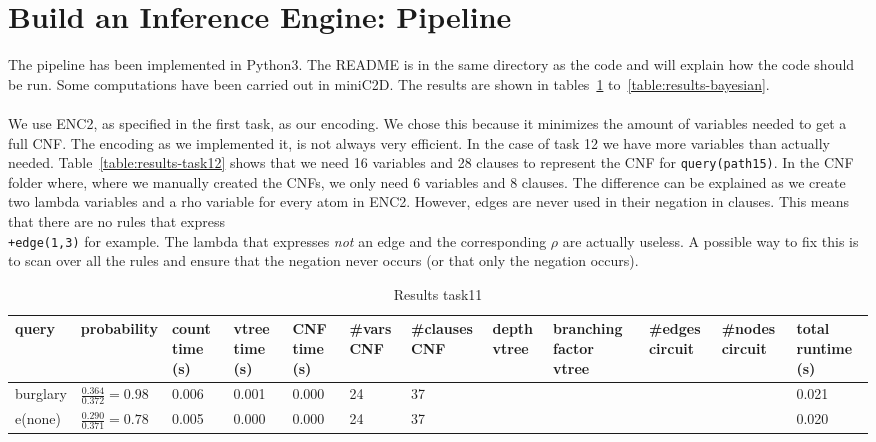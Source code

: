 \section{Build an Inference Engine: Pipeline}

The pipeline has been implemented in Python3. The README is in the same directory as the code and will explain how the code should be run. Some computations have been carried out in miniC2D. The results are shown in tables~\ref{table:results-task11} to~\ref{table:results-bayesian}.
\\\\
We use ENC2, as specified in the first task, as our encoding. We chose this because it minimizes the amount of variables needed to get a full CNF. The encoding as we implemented it, is not always very efficient. In the case of task 12 we have more variables than actually needed. Table~\ref{table:results-task12} shows that we need 16 variables and 28 clauses to represent the CNF for \texttt{query(path15)}. In the CNF folder where, where we manually created the CNFs, we only need 6 variables and 8 clauses. The difference can be explained as we create two lambda variables and a rho variable for every atom in ENC2. However, edges are never used in their negation in clauses. This means that there are no rules that express \texttt{\\+edge(1,3)} for example. The lambda that expresses \textit{not} an edge and the corresponding $\rho$ are actually useless. A possible way to fix this is to scan over all the rules and ensure that the negation never occurs (or that only the negation occurs). 

\begin{table}[h]
\centering
\caption{Results task11}
\label{table:results-task11}
\begin{tabular}{l|l|l|l|l|l|l|l|l|l|l|l}
\textbf{query} & \textbf{probability} & \textbf{count time (s)} & \textbf{vtree time (s)} & \textbf{CNF time (s)} & \textbf{\#vars CNF} & \textbf{\#clauses CNF} & \textbf{depth vtree} & \textbf{branching factor vtree} & \textbf{\#edges circuit} & \textbf{\#nodes circuit} & \textbf{total runtime (s)} \\ \hline
burglary &  $\frac{0.364}{0.372} = 0.98$ & 0.006 & 0.001  &  0.000 &  24 & 37 &   &  &  &  &  0.021 \\
e(none) & $\frac{0.290}{0.371} = 0.78$  & 0.005 & 0.000 &  0.000 & 24 & 37 &  &    &   &  & 0.020
\end{tabular}
\end{table}


